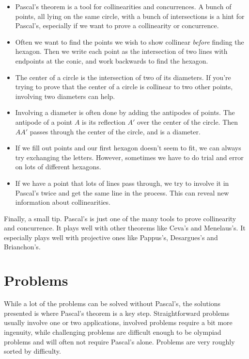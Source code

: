 \documentclass[11pt,paper=letter]{scrartcl}
\begin{document}
\begin{itemize}

\item Pascal's theorem is a tool for collinearities and concurrences. A bunch of points, all lying on the same circle, with a bunch of intersections is a hint for Pascal's, especially if we want to prove a collinearity or concurrence.

\item Often we want to find the points we wish to show collinear \emph{before} finding the hexagon. Then we write each point as the intersection of two lines with endpoints at the conic, and work backwards to find the hexagon.

\item The center of a circle is the intersection of two of its diameters. If you're trying to prove that the center of a circle is collinear to two other points, involving two diameters can help.

\item Involving a diameter is often done by adding the antipodes of points. The antipode of a point $A$ is its reflection $A'$ over the center of the circle. Then $AA'$ passes through the center of the circle, and is a diameter.

\item If we fill out points and our first hexagon doesn't seem to fit, we can always try exchanging the letters. However, sometimes we have to do trial and error on lots of different hexagons.

\item If we have a point that lots of lines pass through, we try to involve it in Pascal's twice and get the same line in the process. This can reveal new information about collinearities.

\end{itemize}

Finally, a small tip. Pascal's is just one of the many tools to prove collinearity and concurrence. It plays well with other theorems like Ceva's and Menelaus's. It especially plays well with projective ones like Pappus's, Desargues's and Brianchon's.

\section{Problems}

While a lot of the problems can be solved without Pascal's, the solutions presented is where Pascal's theorem is a key step. Straightforward problems usually involve one or two applications, involved problems require a bit more ingenuity, while challenging problems are difficult enough to be olympiad problems and will often not require Pascal's alone. Problems are very roughly sorted by difficulty.
\end{document}

